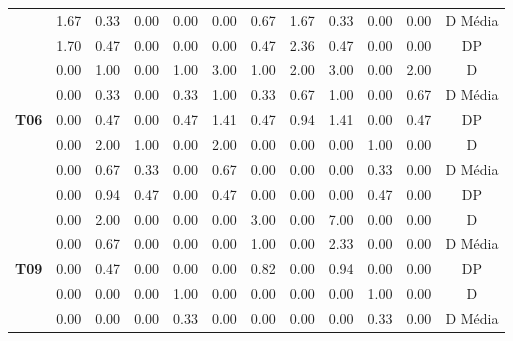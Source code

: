 \begin{table}[htbp]
\begin{tabular}{|c|c|c|c|c|c|c|c|c|c|c|c}
		\cellcolor[HTML]{F2F2F2} & 1.67 & 0.33 & 0.00 & 0.00 & 0.00 & 0.67 & 1.67 & 0.33 & 0.00 & 0.00 & \multicolumn{1}{c|}{D Média} \\ \cline{2-12} 
		\rowcolor[HTML]{D9D9D9} 
		\multirow{-3}{*}{\cellcolor[HTML]{F2F2F2}\textbf{T05}} & 1.70 & 0.47 & 0.00 & 0.00 & 0.00 & 0.47 & 2.36 & 0.47 & 0.00 & 0.00 & \multicolumn{1}{c|}{\cellcolor[HTML]{D9D9D9}DP} \\ \hline
		\cellcolor[HTML]{F2F2F2} & 0.00 & 1.00 & 0.00 & 1.00 & 3.00 & 1.00 & 2.00 & 3.00 & 0.00 & 2.00 & \multicolumn{1}{c|}{D} \\ \cline{2-12} 
		\rowcolor[HTML]{D9D9D9} 
		\cellcolor[HTML]{F2F2F2} & 0.00 & 0.33 & 0.00 & 0.33 & 1.00 & 0.33 & 0.67 & 1.00 & 0.00 & 0.67 & \multicolumn{1}{c|}{\cellcolor[HTML]{D9D9D9}D Média} \\ \cline{2-12} 
		\multirow{-3}{*}{\cellcolor[HTML]{F2F2F2}\textbf{T06}} & 0.00 & 0.47 & 0.00 & 0.47 & 1.41 & 0.47 & 0.94 & 1.41 & 0.00 & 0.47 & \multicolumn{1}{c|}{DP} \\ \hline
		\rowcolor[HTML]{D9D9D9} 
		\cellcolor[HTML]{F2F2F2} & 0.00 & 2.00 & 1.00 & 0.00 & 2.00 & 0.00 & 0.00 & 0.00 & 1.00 & 0.00 & \multicolumn{1}{c|}{\cellcolor[HTML]{D9D9D9}D} \\ \cline{2-12} 
		\cellcolor[HTML]{F2F2F2} & 0.00 & 0.67 & 0.33 & 0.00 & 0.67 & 0.00 & 0.00 & 0.00 & 0.33 & 0.00 & \multicolumn{1}{c|}{D Média} \\ \cline{2-12} 
		\rowcolor[HTML]{D9D9D9} 
		\multirow{-3}{*}{\cellcolor[HTML]{F2F2F2}\textbf{T08}} & 0.00 & 0.94 & 0.47 & 0.00 & 0.47 & 0.00 & 0.00 & 0.00 & 0.47 & 0.00 & \multicolumn{1}{c|}{\cellcolor[HTML]{D9D9D9}DP} \\ \hline
		\cellcolor[HTML]{F2F2F2} & 0.00 & 2.00 & 0.00 & 0.00 & 0.00 & 3.00 & 0.00 & 7.00 & 0.00 & 0.00 & \multicolumn{1}{c|}{D} \\ \cline{2-12} 
		\rowcolor[HTML]{D9D9D9} 
		\cellcolor[HTML]{F2F2F2} & 0.00 & 0.67 & 0.00 & 0.00 & 0.00 & 1.00 & 0.00 & 2.33 & 0.00 & 0.00 & \multicolumn{1}{c|}{\cellcolor[HTML]{D9D9D9}D Média} \\ \cline{2-12} 
		\multirow{-3}{*}{\cellcolor[HTML]{F2F2F2}\textbf{T09}} & 0.00 & 0.47 & 0.00 & 0.00 & 0.00 & 0.82 & 0.00 & 0.94 & 0.00 & 0.00 & \multicolumn{1}{c|}{DP} \\ \hline
		\rowcolor[HTML]{D9D9D9} 
		\cellcolor[HTML]{F2F2F2} & 0.00 & 0.00 & 0.00 & 1.00 & 0.00 & 0.00 & 0.00 & 0.00 & 1.00 & 0.00 & \multicolumn{1}{c|}{\cellcolor[HTML]{D9D9D9}D} \\ \cline{2-12} 
		\cellcolor[HTML]{F2F2F2} & 0.00 & 0.00 & 0.00 & 0.33 & 0.00 & 0.00 & 0.00 & 0.00 & 0.33 & 0.00 & \multicolumn{1}{c|}{D Média} \\ \cline{2-12} 

\end{tabular}
\end{table}
